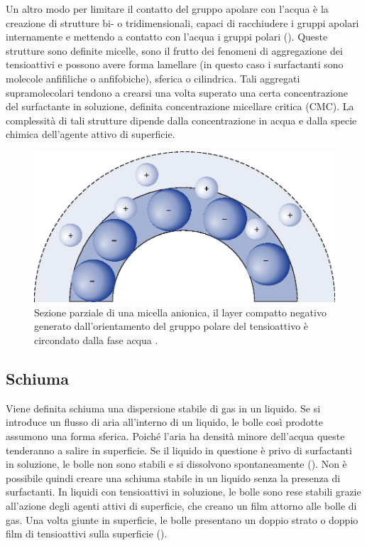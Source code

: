 Un altro modo per limitare il contatto del gruppo apolare con l'acqua è la creazione di strutture bi- o tridimensionali, capaci di racchiudere i gruppi apolari internamente e mettendo a contatto con l'acqua i gruppi polari (). Queste strutture sono definite micelle, sono il frutto dei fenomeni di aggregazione dei tensioattivi e possono avere forma lamellare (in questo caso i surfactanti sono molecole anfifiliche o anfifobiche), sferica o cilindrica.  Tali aggregati supramolecolari tendono a crearsi una volta superato una certa concentrazione del surfactante in soluzione, definita concentrazione micellare critica (CMC). La complessità di tali strutture dipende dalla concentrazione in acqua e dalla specie chimica dell'agente attivo di superficie.

\begin{figure}[htbp]
    \centering
    \includegraphics[width=.5\textwidth]{fig/foamer/micelle.eps}
    \caption{Sezione parziale di una micella anionica, il layer compatto negativo generato dall'orientamento del gruppo polare del tensioattivo è circondato dalla fase acqua  \parencite{attwood2012fasttrack}.}
    \label{fig:micelle}
\end{figure}

\subsection{Schiuma}
Viene definita schiuma una dispersione stabile di gas in un liquido. Se si introduce un flusso di aria all'interno di un liquido, le bolle così prodotte assumono una forma sferica. Poiché l'aria ha densità minore dell'acqua queste tenderanno a salire in superficie. Se il liquido in questione è privo di surfactanti in soluzione, le bolle non sono stabili e si dissolvono spontaneamente (). Non è possibile quindi creare una schiuma stabile in un liquido senza la presenza di surfactanti. In liquidi con tensioattivi in soluzione, le bolle sono rese stabili grazie all'azione degli agenti attivi di superficie, che creano un film attorno alle bolle di gas. Una volta giunte in superficie, le bolle presentano un doppio strato o doppio film di tensioattivi sulla superficie ().

